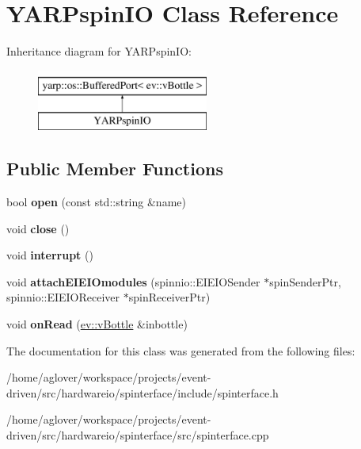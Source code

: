 \hypertarget{classYARPspinIO}{}\section{Y\+A\+R\+Pspin\+IO Class Reference}
\label{classYARPspinIO}
Inheritance diagram for Y\+A\+R\+Pspin\+IO\+:\begin{figure}[H]
\begin{center}
\leavevmode
\includegraphics[height=2.000000cm]{classYARPspinIO}
\end{center}
\end{figure}
\subsection*{Public Member Functions}
\begin{DoxyCompactItemize}
\item 
bool {\bfseries open} (const std\+::string \&name)\hypertarget{classYARPspinIO_ac99ae5b0b8d9308da9a8aa76dd8b7cf6}{}\label{classYARPspinIO_ac99ae5b0b8d9308da9a8aa76dd8b7cf6}

\item 
void {\bfseries close} ()\hypertarget{classYARPspinIO_afbaa4ae29db56e010b1801a9c428386b}{}\label{classYARPspinIO_afbaa4ae29db56e010b1801a9c428386b}

\item 
void {\bfseries interrupt} ()\hypertarget{classYARPspinIO_ad00a2c121cbd513dd32726a26b15bef6}{}\label{classYARPspinIO_ad00a2c121cbd513dd32726a26b15bef6}

\item 
void {\bfseries attach\+E\+I\+E\+I\+Omodules} (spinnio\+::\+E\+I\+E\+I\+O\+Sender $\ast$spin\+Sender\+Ptr, spinnio\+::\+E\+I\+E\+I\+O\+Receiver $\ast$spin\+Receiver\+Ptr)\hypertarget{classYARPspinIO_af51eb6763550906becdf20b596c0adf9}{}\label{classYARPspinIO_af51eb6763550906becdf20b596c0adf9}

\item 
void {\bfseries on\+Read} (\hyperlink{classev_1_1vBottle}{ev\+::v\+Bottle} \&inbottle)\hypertarget{classYARPspinIO_a6f6002f899bdee449f5a695ac6f45dcb}{}\label{classYARPspinIO_a6f6002f899bdee449f5a695ac6f45dcb}

\end{DoxyCompactItemize}


The documentation for this class was generated from the following files\+:\begin{DoxyCompactItemize}
\item 
/home/aglover/workspace/projects/event-\/driven/src/hardwareio/spinterface/include/spinterface.\+h\item 
/home/aglover/workspace/projects/event-\/driven/src/hardwareio/spinterface/src/spinterface.\+cpp\end{DoxyCompactItemize}
